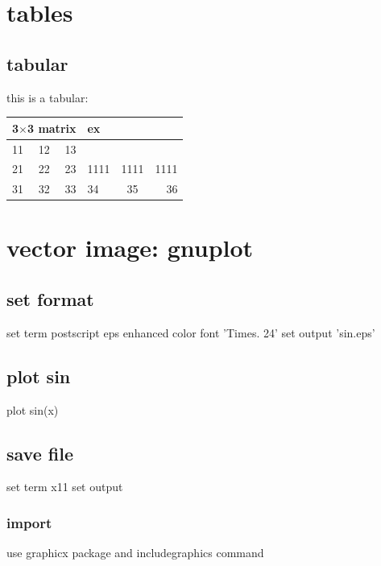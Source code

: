 \documentclass[11pt,a4paper]{article}
\begin{document}
\section{tables}{
  \subsection{tabular}
  this is a tabular: \\
  \begin{tabular}{||lcr|lcr}
    \hline
    \multicolumn{3}{c|}{3$\times$3 matrix} & ex\\
    \hline
    11 & 12 & 13 \\ %
    \hline
    21 & 22 & 23 &1111&1111&1111\\
    \cline{1-2}\cline{4-5}
    31 & 32 & 33 & 34 & 35 & 36
  \end{tabular}
}
\section{vector image: gnuplot}{
  \subsection{set format}{
    set term postscript eps enhanced color font 'Times. 24'
    set output 'sin.eps'
  }
  \subsection{plot sin}{
    plot sin(x)
  }
  \subsection{save file}{
    set term x11
    set output
  }
  \subsubsection{import}{
    use graphicx package and includegraphics command
  }
}
\end{document}
